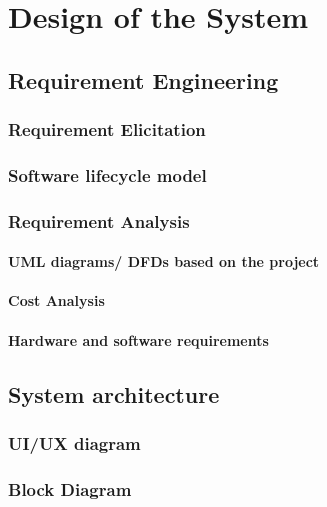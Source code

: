 
\chapter{Design of the System} \label{chap4}
\newpage

\section{Requirement Engineering}

\subsection{Requirement Elicitation}
\subsection{Software lifecycle model}
\subsection{Requirement Analysis}
\subsubsection{UML diagrams/ DFDs based on the project}
\subsubsection{Cost Analysis}
\subsubsection{Hardware and software requirements}


\section{System architecture}
\subsection{UI/UX diagram}
\subsection{Block Diagram}

